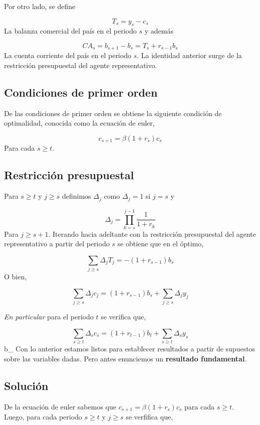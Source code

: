 \documentclass[]{article}
\begin{document}
Por otro lado, se define

\[
T_s = y_s- c_s
\] La balanza comercial del país en el periodo \(s\) y además

\[
CA_s = b_{s+1} - b_s = T_s + r_{s-1}b_s
\] La cuenta corriente del país en el periodo \(s\). La identidad
anterior surge de la restricción presupuestal del agente representativo.

\subsection{Condiciones de primer
orden}\label{condiciones-de-primer-orden}

De las condiciones de primer orden se obtiene la siguiente condición de
optimalidad, conocida como la ecuación de euler,

\[
c_{s+1} = \beta(1+r_s)c_s
\] Para cada \(s \geq t\).

\subsection{Restricción presupuestal}\label{restriccion-presupuestal}

Para \(s \geq t\) y \(j \geq s\) definimos \(\Delta_j\) como
\(\Delta_j = 1\) si \(j = s\) y

\[
\Delta_j = \prod_{k = s}^{j-1} \frac{1}{1+r_k}
\] Para \(j \geq s + 1\). Iterando hacia adeltante con la restricción
presupuestal del agente representativo a partir del periodo \(s\) se
obtiene que en el óptimo,

\[
\sum_{j\geq s} \Delta_jT_j = -(1+r_{s-1})b_s 
\] O bien,

\[
\begin{equation}
\sum_{j\geq s} \Delta_jc_j = (1+r_{s-1})b_s  + \sum_{j\geq s} \Delta_jy_j
\label{eq:rp}
\end{equation}  
\]

\emph{En particular} para el periodo \(t\) se verifica que,

\[
\sum_{s \geq t} \Delta_s c_s = (1+r_{t-1})b_t + \sum_{s \geq t} \Delta_s y_s
\]b\_ Con lo anterior estamos listos para establecer resultados a partir
de supuestos sobre las variables dadas. Pero antes enunciemos un
\textbf{resultado fundamental}.

\subsection{Solución}\label{solucion}

De la ecuación de euler sabemos que \(c_{s+1} = \beta(1+r_s)c_s\) para
cada \(s \geq t\). Luego, para cada periodo \(s \geq t\) y \(j \geq s\)
se verfifica que,
\end{document}
